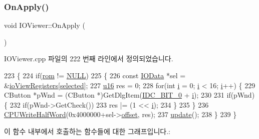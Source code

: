 \subsubsection{\texorpdfstring{On\+Apply()}{OnApply()}}
{\footnotesize\ttfamily void I\+O\+Viewer\+::\+On\+Apply (\begin{DoxyParamCaption}{ }\end{DoxyParamCaption})\hspace{0.3cm}{\ttfamily [protected]}}



I\+O\+Viewer.\+cpp 파일의 222 번째 라인에서 정의되었습니다.


\begin{DoxyCode}
223 \{
224   \textcolor{keywordflow}{if}(\mbox{\hyperlink{_globals_8cpp_adafc6ed627110c42f3893c9783f55320}{rom}} != \mbox{\hyperlink{getopt1_8c_a070d2ce7b6bb7e5c05602aa8c308d0c4}{NULL}})
225   \{
226   \textcolor{keyword}{const} \mbox{\hyperlink{struct_i_o_data}{IOData}} *sel = &\mbox{\hyperlink{_i_o_viewer_regs_8h_af3cc3c5a550a35ca8b49166699140ffc}{ioViewRegisters}}[\mbox{\hyperlink{class_i_o_viewer_a418dd29c924f6fa180e995ba9db8399c}{selected}}];
227   \mbox{\hyperlink{_system_8h_a9e6c91d77e24643b888dbd1a1a590054}{u16}} res = 0;
228   \textcolor{keywordflow}{for}(\textcolor{keywordtype}{int} \mbox{\hyperlink{expr-lex_8cpp_acb559820d9ca11295b4500f179ef6392}{i}} = 0; \mbox{\hyperlink{expr-lex_8cpp_acb559820d9ca11295b4500f179ef6392}{i}} < 16; \mbox{\hyperlink{expr-lex_8cpp_acb559820d9ca11295b4500f179ef6392}{i}}++) \{
229     CButton *pWnd = (CButton *)GetDlgItem(\mbox{\hyperlink{resource_8h_a01e6fe5669dee2629c3b04ae780423af}{IDC\_BIT\_0}} + \mbox{\hyperlink{expr-lex_8cpp_acb559820d9ca11295b4500f179ef6392}{i}});
230       
231     \textcolor{keywordflow}{if}(pWnd) \{
232       \textcolor{keywordflow}{if}(pWnd->GetCheck())
233         res |= (1 << \mbox{\hyperlink{expr-lex_8cpp_acb559820d9ca11295b4500f179ef6392}{i}});
234     \}
235   \}
236   \mbox{\hyperlink{_g_b_a_8cpp_a501750f2f402fd7fa6a88e37011c8f10}{CPUWriteHalfWord}}(0x4000000+sel->\mbox{\hyperlink{struct_i_o_data_a233a9f32b3427e87b64dc90fe22f9b02}{offset}}, res);
237   \mbox{\hyperlink{class_i_o_viewer_a500c8fc593280ff95977fb59293b6ab6}{update}}();
238   \}
239 \}
\end{DoxyCode}
이 함수 내부에서 호출하는 함수들에 대한 그래프입니다.\+:
\nopagebreak
